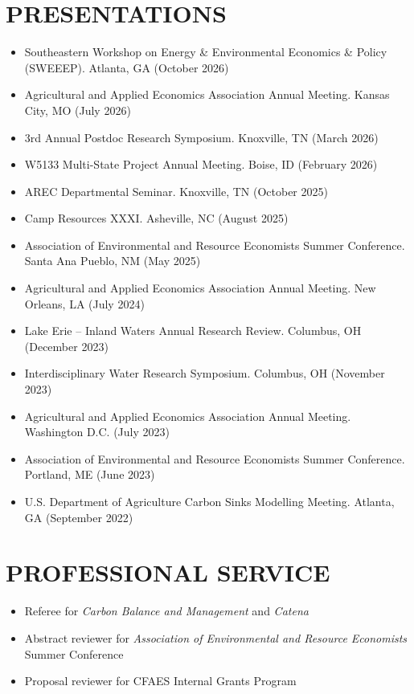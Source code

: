 \documentclass[letterpaper,10pt]{article}
\begin{document}
\section{PRESENTATIONS}
\begin{itemize}[leftmargin=1em, itemsep=1pt, parsep=0pt, topsep=2pt]
    \item Southeastern Workshop on Energy \& Environmental Economics \& Policy (SWEEEP). Atlanta, GA (October 2026)
    \item Agricultural and Applied Economics Association Annual Meeting. Kansas City, MO (July 2026)
    \item 3rd Annual Postdoc Research Symposium. Knoxville, TN (March 2026)
    \item W5133 Multi-State Project Annual Meeting. Boise, ID (February 2026)
    \item AREC Departmental Seminar. Knoxville, TN (October 2025)
    \item Camp Resources XXXI. Asheville, NC (August 2025)
    \item Association of Environmental and Resource Economists Summer Conference. Santa Ana Pueblo, NM (May 2025)
    \item Agricultural and Applied Economics Association Annual Meeting. New Orleans, LA (July 2024)
    \item Lake Erie -- Inland Waters Annual Research Review. Columbus, OH (December 2023)
    \item Interdisciplinary Water Research Symposium. Columbus, OH (November 2023)
    \item Agricultural and Applied Economics Association Annual Meeting. Washington D.C. (July 2023)
    \item Association of Environmental and Resource Economists Summer Conference. Portland, ME (June 2023)
    \item U.S. Department of Agriculture Carbon Sinks Modelling Meeting. Atlanta, GA (September 2022)
\end{itemize}

\section{PROFESSIONAL SERVICE}
\begin{itemize}[leftmargin=1em, itemsep=3pt, parsep=0pt, topsep=3pt]
    \item Referee for \textit{Carbon Balance and Management} and \textit{Catena}
    \item Abstract reviewer for \textit{Association of Environmental and Resource Economists} Summer Conference
    \item Proposal reviewer for CFAES Internal Grants Program
\end{itemize}
\end{document}
